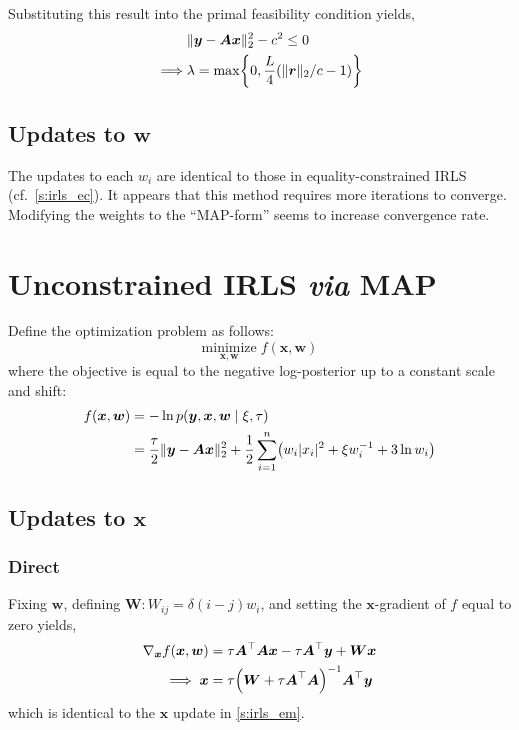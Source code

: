 \documentclass{article}
\numberwithin{equation}{section}
\newcommand{\lh}{\mathopen{}\mathclose\bgroup\left}
\newcommand{\rh}{\aftergroup\egroup\right}
\newcommand{\m}[1]{\boldsymbol{#1}}
\begin{document}
Substituting this result into the primal feasibility condition yields,
\begin{equation}
\begin{aligned}
&\| \m{y} - \m{A} \m{x} \|_2^2 - c^2 \le 0
\\ \implies
&\lambda = \max\lh\{
 0, \frac{L}{4} \lh ( \| \m{r} \|_2 / c - 1 \rh) \rh\}
\end{aligned}
\end{equation}

\subsection{Updates to $\m{w}$}
The updates to each $w_i$ are identical to those in equality-constrained
IRLS (cf.~\ref{s:irls_ec}). It appears that this method requires more
iterations to converge. Modifying the weights to the ``MAP-form''
seems to increase convergence rate.

\clearpage
\section{Unconstrained IRLS \emph{via} MAP}
\label{s:irls_map}
Define the optimization problem as follows:
\begin{equation}
\underset{\m{x}, \m{w}}{\text{minimize}} \; f(\m{x}, \m{w})
\end{equation}
where the objective is equal to the negative log-posterior up to a constant
scale and shift:
\begin{equation}
\begin{aligned}
f(\m{x}, \m{w}) &=
 -\ln p(\m{y}, \m{x}, \m{w} \mid \xi, \tau)
\\ &=
 \frac{\tau}{2} \| \m{y} - \m{A} \m{x} \|_2^2 +
 \frac{1}{2} \sum_{i=1}^n \lh( w_i |x_i|^2 + \xi w_i^{-1} + 3 \ln w_i \rh)
\end{aligned}
\end{equation}

\subsection{Updates to $\m{x}$}
\subsubsection{Direct}
Fixing $\m{w}$, defining $\m{W} : W_{ij} = \delta(i-j) w_i$, and setting
the $\m{x}$-gradient of $f$ equal to zero yields,
\begin{equation}
\begin{aligned}
\nabla_{\m{x}} f(\m{x}, \m{w}) &=
  \tau \m{A}^\top \m{A} \m{x} - \tau \m{A}^\top \m{y} + \m{W} \m{x}
\\ \implies
 \m{x} &= \tau \lh( \m{W} + \tau \m{A}^\top \m{A} \rh)^{-1}
 \m{A}^\top \m{y}
\end{aligned}
\end{equation}
which is identical to the $\m{x}$ update in \ref{s:irls_em}.
\end{document}
